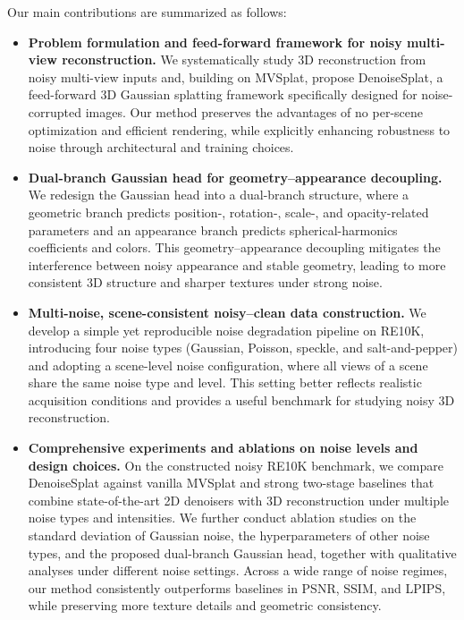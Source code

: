 Our main contributions are summarized as follows:
\begin{itemize}[leftmargin=*,
                topsep=0pt,itemsep=0pt,parsep=0pt,partopsep=0pt]
    \item \textbf{Problem formulation and feed-forward framework for noisy multi-view reconstruction.}
    We systematically study 3D reconstruction from noisy multi-view inputs and, building on MVSplat, propose DenoiseSplat, a feed-forward 3D Gaussian splatting framework specifically designed for noise-corrupted images. Our method preserves the advantages of no per-scene optimization and efficient rendering, while explicitly enhancing robustness to noise through architectural and training choices.
    
    \item \textbf{Dual-branch Gaussian head for geometry--appearance decoupling.}
    We redesign the Gaussian head into a dual-branch structure, where a geometric branch predicts position-, rotation-, scale-, and opacity-related parameters and an appearance branch predicts spherical-harmonics coefficients and colors. This geometry--appearance decoupling mitigates the interference between noisy appearance and stable geometry, leading to more consistent 3D structure and sharper textures under strong noise.
    
    \item \textbf{Multi-noise, scene-consistent noisy--clean data construction.}
    We develop a simple yet reproducible noise degradation pipeline on RE10K, introducing four noise types (Gaussian, Poisson, speckle, and salt-and-pepper) and adopting a scene-level noise configuration, where all views of a scene share the same noise type and level. This setting better reflects realistic acquisition conditions and provides a useful benchmark for studying noisy 3D reconstruction.
    
    \item \textbf{Comprehensive experiments and ablations on noise levels and design choices.}
    On the constructed noisy RE10K benchmark, we compare DenoiseSplat against vanilla MVSplat and strong two-stage baselines that combine state-of-the-art 2D denoisers with 3D reconstruction under multiple noise types and intensities. We further conduct ablation studies on the standard deviation of Gaussian noise, the hyperparameters of other noise types, and the proposed dual-branch Gaussian head, together with qualitative analyses under different noise settings. Across a wide range of noise regimes, our method consistently outperforms baselines in PSNR, SSIM, and LPIPS, while preserving more texture details and geometric consistency.
\end{itemize}

